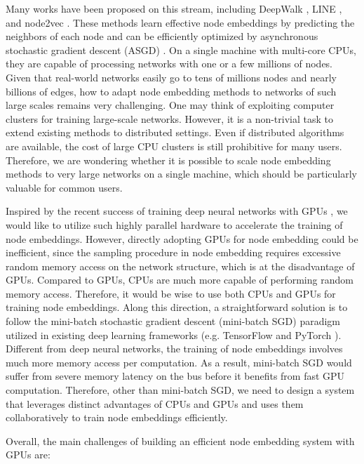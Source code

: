 \documentclass[sigconf]{acmart}
\begin{document}
Many works have been proposed on this stream, including DeepWalk \cite{perozzi2014deepwalk}, LINE \cite{tang2015line}, and node2vec \cite{grover2016node2vec}. These methods learn effective node embeddings by predicting the neighbors of each node and can be efficiently optimized by asynchronous stochastic gradient descent (ASGD) \cite{recht2011hogwild}. On a single machine with multi-core CPUs, they are capable of processing networks with one or a few millions of nodes. Given that real-world networks easily go to tens of millions nodes and nearly billions of edges, how to adapt node embedding methods to networks of such large scales remains very challenging. One may think of exploiting computer clusters for training large-scale networks. However, it is a non-trivial task to extend existing methods to distributed settings. Even if distributed algorithms are available, the cost of large CPU clusters is still prohibitive for many users. Therefore, we are wondering whether it is possible to scale node embedding methods to very large networks on a single machine, which should be particularly valuable for common users.

Inspired by the recent success of training deep neural networks with GPUs \cite{ciresan2011flexible, krizhevsky2012imagenet}, we would like to utilize such highly parallel hardware to accelerate the training of node embeddings. However, directly adopting GPUs for node embedding could be inefficient, since the sampling procedure in node embedding requires excessive random memory access on the network structure, which is at the disadvantage of GPUs. Compared to GPUs, CPUs are much more capable of performing random memory access. Therefore, it would be wise to use both CPUs and GPUs for training node embeddings. Along this direction, a straightforward solution is to follow the mini-batch stochastic gradient descent (mini-batch SGD) paradigm utilized in existing deep learning frameworks (e.g. TensorFlow \cite{abadi2016tensorflow} and PyTorch \cite{paszke2017automatic}). Different from deep neural networks, the training of node embeddings involves much more memory access per computation. As a result, mini-batch SGD would suffer from severe memory latency on the bus before it benefits from fast GPU computation. Therefore, other than mini-batch SGD, we need to design a system that leverages distinct advantages of CPUs and GPUs and uses them collaboratively to train node embeddings efficiently.

Overall, the main challenges of building an efficient node embedding system with GPUs are:
\end{document}
